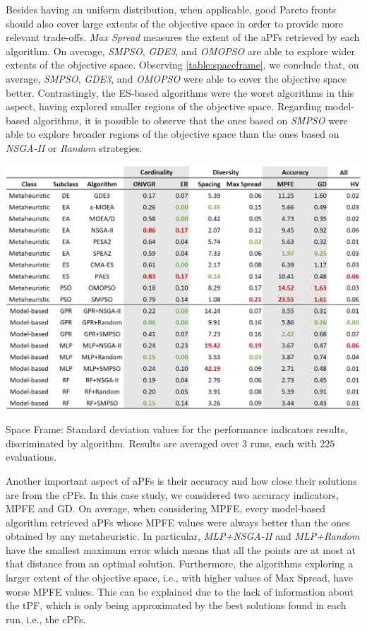 Besides having an uniform distribution, when applicable, good Pareto fronts should also cover large extents of the objective space in order to provide more relevant trade-offs. \textit{Max Spread} measures the extent of the \acp{aPF} retrieved by each algorithm. On average, \textit{SMPSO}, \textit{GDE3}, and \textit{OMOPSO} are able to explore wider extents of the objective space. Observing \cref{table:spaceframe}, we conclude that, on average, \textit{SMPSO}, \textit{GDE3}, and \textit{OMOPSO} were able to cover the objective space better. Contrastingly, the \ac{ES}-based algorithms were the worst algorithms in this aspect, having explored smaller regions of the objective space. Regarding model-based algorithms, it is possible to observe that the ones based on \textit{SMPSO} were able to explore broader regions of the objective space than the ones based on \textit{NSGA-II} or \textit{Random} strategies. 
\begin{table}[]
	\centering
	\includegraphics[width=\textwidth]{Images/Evaluation/caadria/Results_Std_20190428.PNG}
	\caption[Space Frame: Standard deviation values for the performance indicators results, discriminated by each algorithm]{Space Frame: Standard deviation values for the performance indicators results, discriminated by algorithm. Results are averaged over $3$ runs, each with $225$ evaluations.}
	\label{table:spaceframestd}
\end{table}

Another important aspect of \acp{aPF} is their accuracy and how close their solutions are from the \acp{cPF}. In this case study, we considered two accuracy indicators, \ac{MPFE} and \ac{GD}. On average, when considering \ac{MPFE}, every model-based algorithm retrieved \acp{aPF} whose \ac{MPFE} values were always better than the ones obtained by any metaheuristic. In particular, \textit{MLP+NSGA-II} and \textit{MLP+Random} have the smallest maximum error which means that all the points are at most at that distance from an optimal solution. Furthermore, the algorithms exploring a larger extent of the objective space, i.e., with higher values of Max Spread, have worse \ac{MPFE} values. This can be explained due to the lack of information about the \ac{tPF}, which is only being approximated by the best solutions found in each run, i.e., the \acp{cPF}. 

